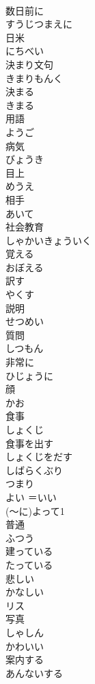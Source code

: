 \documentclass[8pt]{extreport}
\begin{document}
\begin{CJK}{UTF8}{min}
\\	数日前に	
\\	すうじつまえに
\\	日米	
\\	にちべい
\\	決まり文句	
\\	きまりもんく
\\	決まる	
\\	きまる
\\	用語	
\\	ようご
\\	病気	
\\	びょうき
\\	目上	
\\	めうえ
\\	相手	
\\	あいて
\\	社会教育	
\\	しゃかいきょういく
\\	覚える	
\\	おぼえる
\\	訳す	
\\	やくす
\\	説明	
\\	せつめい
\\	質問	
\\	しつもん
\\	非常に	
\\	ひじょうに
\\	顔	
\\	かお
\\	食事	
\\	しょくじ
\\	食事を出す	
\\	しょくじをだす
\\	しばらくぶり	
\\	つまり	
\\	よい	＝いい	
\\	(～に)よって1	
\\	普通	
\\	ふつう
\\	建っている	
\\	たっている
\\	悲しい	
\\	かなしい
\\	リス	
\\	写真	
\\	しゃしん
\\	かわいい	
\\	案内する	
\\	あんないする

\end{CJK}
\end{document}

